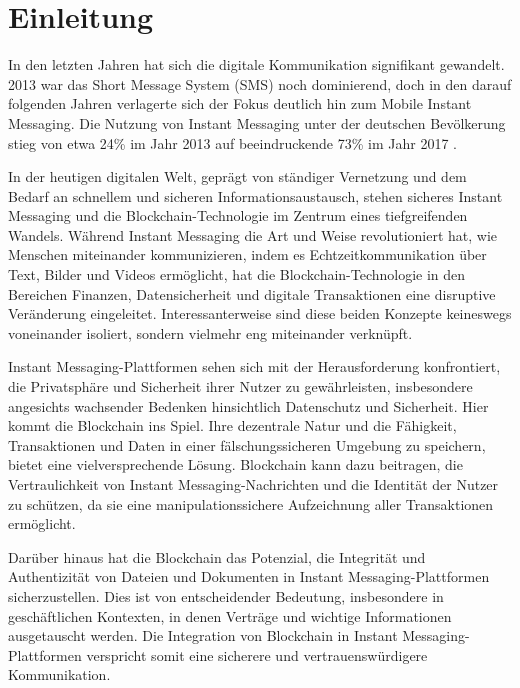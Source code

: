 \chapter{Einleitung}
In den letzten Jahren hat sich die digitale Kommunikation signifikant gewandelt. 2013 war das Short Message System (SMS) noch dominierend, doch in den darauf folgenden Jahren verlagerte sich der Fokus deutlich hin zum Mobile Instant Messaging. Die Nutzung von Instant Messaging unter der deutschen Bevölkerung stieg von etwa 24\% im Jahr 2013 auf beeindruckende 73\% im Jahr 2017 \parencite{Hedda_digiKommunikationVeraendert}.

In der heutigen digitalen Welt, geprägt von ständiger Vernetzung und dem Bedarf an schnellem und sicheren Informationsaustausch, stehen sicheres Instant Messaging und die Blockchain-Technologie im Zentrum eines tiefgreifenden Wandels. Während Instant Messaging die Art und Weise revolutioniert hat, wie Menschen miteinander kommunizieren, indem es Echtzeitkommunikation über Text, Bilder und Videos ermöglicht, hat die Blockchain-Technologie in den Bereichen Finanzen, Datensicherheit und digitale Transaktionen eine disruptive Veränderung eingeleitet. Interessanterweise sind diese beiden Konzepte keineswegs voneinander isoliert, sondern vielmehr eng miteinander verknüpft.

Instant Messaging-Plattformen sehen sich mit der Herausforderung konfrontiert, die Privatsphäre und Sicherheit ihrer Nutzer zu gewährleisten, insbesondere angesichts wachsender Bedenken hinsichtlich Datenschutz und Sicherheit. Hier kommt die Blockchain ins Spiel. Ihre dezentrale Natur und die Fähigkeit, Transaktionen und Daten in einer fälschungssicheren Umgebung zu speichern, bietet eine vielversprechende Lösung. Blockchain kann dazu beitragen, die Vertraulichkeit von Instant Messaging-Nachrichten und die Identität der Nutzer zu schützen, da sie eine manipulationssichere Aufzeichnung aller Transaktionen ermöglicht. 

Darüber hinaus hat die Blockchain das Potenzial, die Integrität und Authentizität von Dateien und Dokumenten in Instant Messaging-Plattformen sicherzustellen. Dies ist von entscheidender Bedeutung, insbesondere in geschäftlichen Kontexten, in denen Verträge und wichtige Informationen ausgetauscht werden. Die Integration von Blockchain in Instant Messaging-Plattformen verspricht somit eine sicherere und vertrauenswürdigere Kommunikation.

